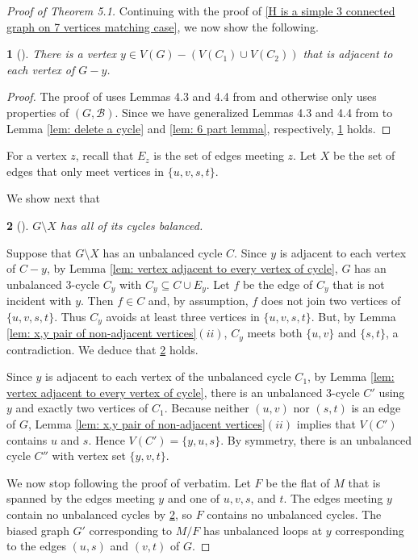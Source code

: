 \documentclass[12pt]{article}
\theoremstyle{definition}
\theoremstyle{plain} %
\newtheorem{subtheorem}{}[theorem]
\newcommand{\cB}{\mathcal{B}}
\newcommand{\del}{\!\setminus\!}
\begin{document}
\begin{proof}[Proof of Theorem 5.1]
Continuing with the proof of \ref{H is a simple 3 connected graph on 7 vertices matching case}, we now show the following.
\begin{subtheorem}[{\cite[4.4.3]{Fife-Mayhew-Oxley-Semple2020}}] \label{vertex adjacent to every vertex of G-y} 
    There is a vertex $y\in V(G)-(V(C_1)\cup V(C_2))$ that is adjacent to each vertex of $G-y$.
\end{subtheorem}
\begin{proof}
The proof of \cite[4.4.3]{Fife-Mayhew-Oxley-Semple2020} uses Lemmas 4.3 and 4.4 from \cite{Fife-Mayhew-Oxley-Semple2020} and otherwise only uses properties of $(G, \cB)$.
Since we have generalized Lemmas 4.3 and 4.4 from \cite{Fife-Mayhew-Oxley-Semple2020} to Lemma \ref{lem: delete a cycle} and \ref{lem: 6 part lemma}, respectively, \ref{vertex adjacent to every vertex of G-y} holds.
\end{proof}


For a vertex $z$, recall that $E_z$ is the set of edges meeting $z$. Let $X$ be the set of edges that only meet vertices in $\{u, v, s, t\}$. 

We show next that
\begin{subtheorem}[{\cite[4.4.4]{Fife-Mayhew-Oxley-Semple2020}}] \label{subthm: G delete X is balanced}
    $G\del X$ has all of its cycles balanced.
\end{subtheorem}
Suppose that $G\del X$ has an unbalanced cycle $C$. Since $y$ is adjacent to each vertex of $C-y$, by Lemma \ref{lem: vertex adjacent to every vertex of cycle}, $G$ has an unbalanced 3-cycle $C_y$ with $C_y\subseteq C\cup E_y$. Let $f$ be the edge of $C_y$ that is not incident with $y$. Then $f\in C$ and, by assumption, $f$ does not join two vertices of $\{u,v,s,t\}$. Thus $C_y$ avoids at least three vertices in $\{u,v,s,t\}$. But, by Lemma \ref{lem: x,y pair of non-adjacent vertices}$(ii)$, $C_y$ meets both $\{u,v\}$ and $\{s,t\}$, a contradiction. We deduce that \ref{subthm: G delete X is balanced} holds. 

Since $y$ is adjacent to each vertex of the unbalanced cycle $C_1$, by Lemma \ref{lem: vertex adjacent to every vertex of cycle}, there is an unbalanced 3-cycle $C'$ using $y$ and exactly two vertices of $C_1$. Because neither $(u,v)$ nor $(s,t)$ is an edge of $G$, Lemma \ref{lem: x,y pair of non-adjacent vertices}$(ii)$ implies that $V(C')$ contains $u$ and $s$. Hence $V(C')=\{y,u,s\}$. By symmetry, there is an unbalanced cycle $C''$ with vertex set $\{y,v,t\}$. 

We now stop following the proof of \cite[Theorem 4.1]{Fife-Mayhew-Oxley-Semple2020} verbatim.
Let $F$ be the flat of $M$ that is spanned by the edges meeting $y$ and one of $u,v,s$, and $t$. 
The edges meeting $y$ contain no unbalanced cycles by \ref{subthm: G delete X is balanced}, so $F$ contains no unbalanced cycles. 
The biased graph $G'$ corresponding to $M/F$ has unbalanced loops at $y$ corresponding to the edges $(u,s)$ and $(v,t)$ of $G$. 


\end{proof}
\end{document}
